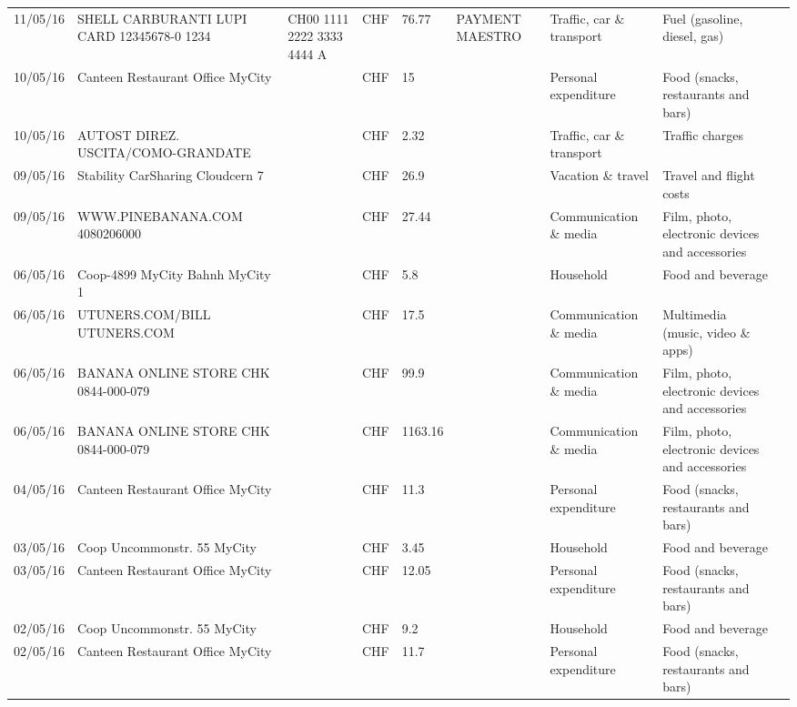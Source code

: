 \begin{landscape}
\begin{tiny}
\begin{longtable}{lp{4cm}llllp{3cm}ll}
		    11/05/16 & SHELL CARBURANTI LUPI CARD 12345678-0 1234 & CH00 1111 2222 3333 4444 A & CHF   & 76.77 & PAYMENT MAESTRO & Traffic, car \& transport & Fuel (gasoline, diesel, gas) \\
		    10/05/16 & Canteen Restaurant Office      MyCity &       & CHF   & 15    &       & Personal expenditure & Food (snacks, restaurants and bars) \\
		    10/05/16 & AUTOST DIREZ. USCITA/COMO-GRANDATE &       & CHF   & 2.32  &       & Traffic, car \& transport & Traffic charges \\
		    09/05/16 & Stability CarSharing      Cloudcern 7 &       & CHF   & 26.9  &       & Vacation \& travel & Travel and flight costs \\
		    09/05/16 & WWW.PINEBANANA.COM           4080206000 &       & CHF   & 27.44 &       & Communication \& media & Film, photo, electronic devices and accessories \\
		    06/05/16 & Coop-4899 MyCity Bahnh   MyCity 1 &       & CHF   & 5.8   &       & Household & Food and beverage \\
		    06/05/16 & UTUNERS.COM/BILL          UTUNERS.COM &       & CHF   & 17.5  &       & Communication \& media & Multimedia (music, video \& apps) \\
		    06/05/16 & BANANA ONLINE STORE CHK   0844-000-079 &       & CHF   & 99.9  &       & Communication \& media & Film, photo, electronic devices and accessories \\
		    06/05/16 & BANANA ONLINE STORE CHK   0844-000-079 &       & CHF   & 1163.16 &       & Communication \& media & Film, photo, electronic devices and accessories \\
		    04/05/16 & Canteen Restaurant Office      MyCity &       & CHF   & 11.3  &       & Personal expenditure & Food (snacks, restaurants and bars) \\
		    03/05/16 & Coop Uncommonstr. 55   MyCity &       & CHF   & 3.45  &       & Household & Food and beverage \\
		    03/05/16 & Canteen Restaurant Office      MyCity &       & CHF   & 12.05 &       & Personal expenditure & Food (snacks, restaurants and bars) \\
		    02/05/16 & Coop Uncommonstr. 55   MyCity &       & CHF   & 9.2   &       & Household & Food and beverage \\
		    02/05/16 & Canteen Restaurant Office      MyCity &       & CHF   & 11.7  &       & Personal expenditure & Food (snacks, restaurants and bars) \\

\end{longtable}
\end{tiny}
\end{landscape}
